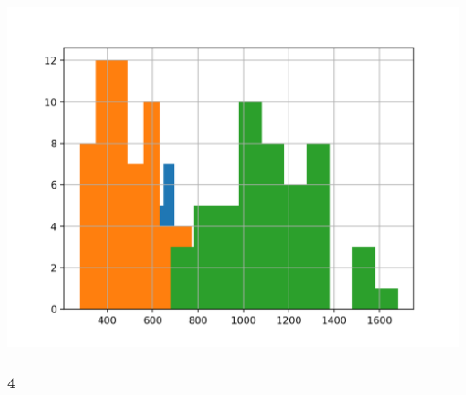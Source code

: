 \documentclass{article}
\begin{document}
\includegraphics[width=\textwidth]{v13.png}\\

\subsubsection*{4}
\end{document}
